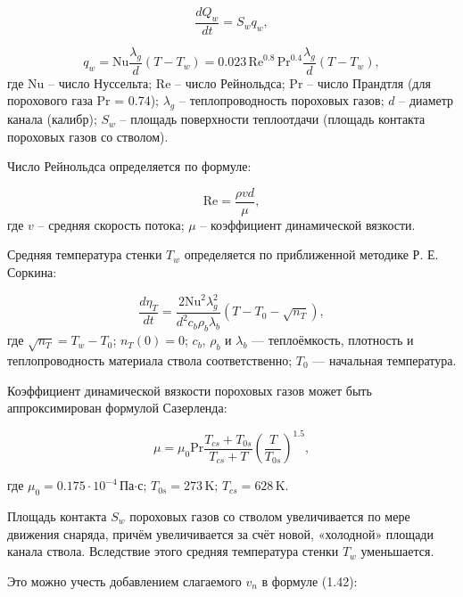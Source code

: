 \documentclass[14pt, a4paper]{extreport} %
\begin{document}
\begin{equation}
\frac{dQ_{w}}{dt} = S_{w} q_{w},
\end{equation}

\begin{equation}
q_{w} = \mathrm{Nu} \frac{\lambda_g}{d} (T - T_{w}) = 0.023 \, \mathrm{Re}^{0.8} \, \mathrm{Pr}^{0.4} \frac{\lambda_g}{d} (T - T_{w}),
\end{equation}
где Nu -- число Нуссельта; Re -- число Рейнольдса; Pr -- число Прандтля (для порохового газа Pr = 0.74); $\lambda_g$ -- теплопроводность пороховых газов; $d$ -- диаметр канала (калибр); $S_w$ -- площадь поверхности теплоотдачи (площадь контакта пороховых газов со стволом).

Число Рейнольдса определяется по формуле:

\begin{equation}
\mathrm{Re} = \frac{\rho v d}{\mu},
\end{equation}
где $v$ -- средняя скорость потока; $\mu$ -- коэффициент динамической вязкости.
 
Средняя температура стенки \( T_w \) определяется по приближенной методике Р. Е. Соркина:

\begin{equation}
\frac{d\eta_T}{dt} = \frac{2 \mathrm{Nu}^2 \lambda_g^2}{d^2 c_b \rho_b \lambda_b} \left( T - T_0 - \sqrt{n_T} \right),
\end{equation}
где \( \sqrt{n_T} = T_w - T_0 \); \( n_T(0) = 0 \); \( c_b, \, \rho_b \) и \( \lambda_b \) — теплоёмкость, плотность и теплопроводность материала ствола соответственно; \( T_0 \) — начальная температура.

Коэффициент динамической вязкости пороховых газов может быть аппроксимирован формулой Сазерленда:

\begin{equation}
\mu = \mu_0 \mathrm{Pr} \frac{T_{cs} + T_{0s}}{T_{cs} + T} \left( \frac{T}{T_{0s}} \right)^{1.5},
\tag{1.43}
\end{equation}

где \( \mu_0 = 0.175 \cdot 10^{-4} \, \text{Па·с} \); \( T_{0s} = 273 \, \text{K} \); \( T_{cs} = 628 \, \text{K} \).

Площадь контакта \( S_w \) пороховых газов со стволом увеличивается по мере движения снаряда, причём увеличивается за счёт новой, «холодной» площади канала ствола. Вследствие этого средняя температура стенки \( T_w \) уменьшается.

Это можно учесть добавлением слагаемого \( v_n \) в формуле (1.42):
\end{document}
